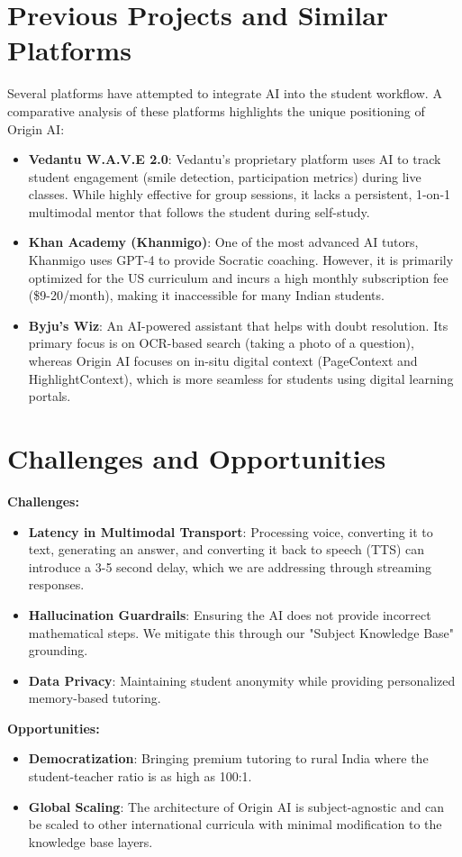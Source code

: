 \section{Previous Projects and Similar Platforms}

Several platforms have attempted to integrate AI into the student workflow. A comparative analysis of these platforms highlights the unique positioning of Origin AI:

\begin{itemize}
    \item \textbf{Vedantu W.A.V.E 2.0}: Vedantu's proprietary platform uses AI to track student engagement (smile detection, participation metrics) during live classes. While highly effective for group sessions, it lacks a persistent, 1-on-1 multimodal mentor that follows the student during self-study.
    \item \textbf{Khan Academy (Khanmigo)}: One of the most advanced AI tutors, Khanmigo uses GPT-4 to provide Socratic coaching. However, it is primarily optimized for the US curriculum and incurs a high monthly subscription fee (\$9-20/month), making it inaccessible for many Indian students.
    \item \textbf{Byju's Wiz}: An AI-powered assistant that helps with doubt resolution. Its primary focus is on OCR-based search (taking a photo of a question), whereas Origin AI focuses on in-situ digital context (PageContext and HighlightContext), which is more seamless for students using digital learning portals.
\end{itemize}

\section{Challenges and Opportunities}

\textbf{Challenges:}
\begin{itemize}
    \item \textbf{Latency in Multimodal Transport}: Processing voice, converting it to text, generating an answer, and converting it back to speech (TTS) can introduce a 3-5 second delay, which we are addressing through streaming responses.
    \item \textbf{Hallucination Guardrails}: Ensuring the AI does not provide incorrect mathematical steps. We mitigate this through our "Subject Knowledge Base" grounding.
    \item \textbf{Data Privacy}: Maintaining student anonymity while providing personalized memory-based tutoring.
\end{itemize}

\textbf{Opportunities:}
\begin{itemize}
    \item \textbf{Democratization}: Bringing premium tutoring to rural India where the student-teacher ratio is as high as 100:1.
    \item \textbf{Global Scaling}: The architecture of Origin AI is subject-agnostic and can be scaled to other international curricula with minimal modification to the knowledge base layers.
\end{itemize}


